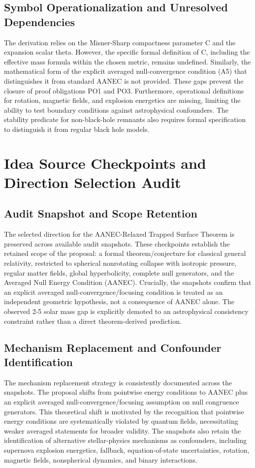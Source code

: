 \documentclass[conference]{IEEEtran}
\begin{document}
\subsection{Symbol Operationalization and Unresolved Dependencies}
The derivation relies on the Misner-Sharp compactness parameter C and the expansion scalar theta. However, the specific formal definition of C, including the effective mass formula within the chosen metric, remains undefined. Similarly, the mathematical form of the explicit averaged null-convergence condition (A5) that distinguishes it from standard AANEC is not provided. These gaps prevent the closure of proof obligations PO1 and PO3. Furthermore, operational definitions for rotation, magnetic fields, and explosion energetics are missing, limiting the ability to test boundary conditions against astrophysical confounders. The stability predicate for non-black-hole remnants also requires formal specification to distinguish it from regular black hole models.

\section{Idea Source Checkpoints and Direction Selection Audit}
\subsection{Audit Snapshot and Scope Retention}
The selected direction for the AANEC-Relaxed Trapped Surface Theorem is preserved across available audit snapshots. These checkpoints establish the retained scope of the proposal: a formal theorem/conjecture for classical general relativity, restricted to spherical nonrotating collapse with isotropic pressure, regular matter fields, global hyperbolicity, complete null generators, and the Averaged Null Energy Condition (AANEC). Crucially, the snapshots confirm that an explicit averaged null-convergence/focusing condition is treated as an independent geometric hypothesis, not a consequence of AANEC alone. The observed 2-5 solar mass gap is explicitly demoted to an astrophysical consistency constraint rather than a direct theorem-derived prediction.

\subsection{Mechanism Replacement and Confounder Identification}
The mechanism replacement strategy is consistently documented across the snapshots. The proposal shifts from pointwise energy conditions to AANEC plus an explicit averaged null-convergence/focusing assumption on null congruence generators. This theoretical shift is motivated by the recognition that pointwise energy conditions are systematically violated by quantum fields, necessitating weaker averaged statements for broader validity. The snapshots also retain the identification of alternative stellar-physics mechanisms as confounders, including supernova explosion energetics, fallback, equation-of-state uncertainties, rotation, magnetic fields, nonspherical dynamics, and binary interactions.~\cite{cite_0ed84243cf171bc4}
\end{document}
